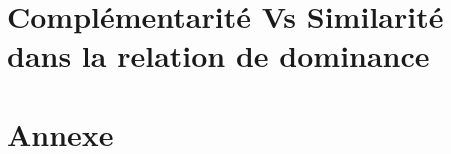 \documentclass[a4paper, 11pt]{book}
\begin{document}
	

%	
%	
\chapter{Complémentarité Vs Similarité dans la relation de dominance}

	
	\chapter{Annexe}

		
			\label{chap:Annexe}

	
	
\end{document}

